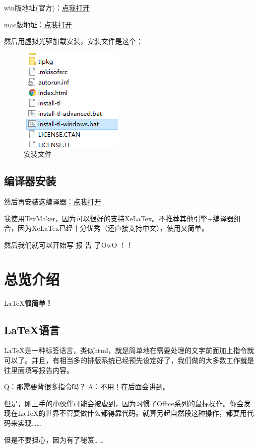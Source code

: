 \documentclass[12pt,a4paper,oneside]{book}
\begin{document}
win版地址(官方)：\href{https://www.tug.org/texlive/acquire-iso.html}{点我打开}

mac版地址：\href{http://pan.baidu.com/share/link?uk=2064390295&shareid=584901926&third=0&adapt=pc&fr=ftw}{点我打开}


\par

然后用虚拟光驱加载安装，安装文件是这个：
\par

\begin{figure}[htp] 
\centering 
\includegraphics[scale=0.75]{Figures/tl.png}
\caption{安装文件}%
\label{pic:tl}
\end{figure}
\vspace{2em}

\section{编译器安装}
\par
然后再安装这编译器：\href{http://www.xm1math.net/texmaker/download.html}{点我打开}
\par
我使用TexMaker，因为可以很好的支持XeLaTex。不推荐其他引擎+编译器组合，因为XeLaTex已经十分优秀（还直接支持中文），使用又简单。
\par
然后我们就可以开始写 报 告 了OwO ！！
\chapter{总览介绍}
\begin{center}
\LaTeX {\bfseries {很简单！}}
\end{center}
\vspace{2em}
\section{LaTeX语言}
\LaTeX 是一种{\color{cyan}标签语言}，类似html，就是简单地在需要处理的文字前面加上指令就可以了。并且，有相当多的排版系统已经预先设定好了，我们做的大多数工作就是往里面填写报告内容。
\par
Q：那需要背很多指令吗？ A：{\color{cyan}不用}！在后面会讲到。
\par
但是，刚上手的小伙伴可能会被虐到，因为习惯了Office系列的鼠标操作。你会发现在\LaTeX 的世界不管要做什么都得靠{\color{cyan}代码}。就算另起自然段这种操作，都要用代码来实现……
\par
但是不要担心，因为有了秘笈……
\end{document}
